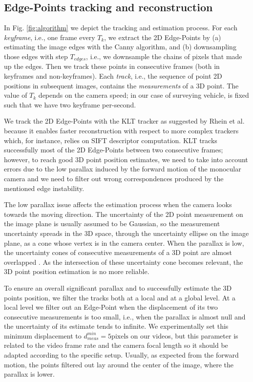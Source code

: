 

\subsection{Edge-Points tracking and reconstruction}
\label{subsubsec:Edge-Point-tracking}
In Fig. \ref{fig:algorithm} we depict the tracking and estimation process.
For each \emph{keyframe}, i.e., one frame every $T_k$, we extract the 2D Edge-Points by (a) estimating the image edges with the Canny algorithm, and (b) downsampling those edges with step $T_{edges}$, i.e., we downsample the chains of pixels that made up the edges. 
Then we track these points in consecutive frames (both in keyframes and non-keyframes). Each \emph{track}, i.e., the sequence of point 2D positions in subsequent images, contains the \emph{measurements} of a 3D point. The value of $T_k$ depends on the camera speed; in our case of surveying vehicle, is fixed such that we have two keyframe per-second. 


We track the 2D Edge-Points with the KLT tracker \cite{Lucas_Kanade81} as suggested by Rhein et al. \cite{Rhein_et_al13} because it enables faster reconstruction with respect to more complex trackers which, for instance, relies on SIFT descriptor computation.
KLT tracks successfully most of the 2D Edge-Points between two consecutive frames; however, to reach good 3D point position estimates, we need to take into account errors due to the low parallax induced by the forward motion of the monocular camera and we need to filter out wrong correspondences produced by the mentioned edge instability. 


The low parallax issue affects the estimation process when the camera looks towards the moving direction. The uncertainty of the 2D point measurement on the image plane is usually assumed to be Gaussian, so the measurement uncertainty spreads in the 3D space, through the uncertainty ellipse on the image plane, as a cone whose vertex is in the camera center. 
When the parallax is low, the uncertainty cones of consecutive measurements of a 3D point are almost overlapped \cite{hazi04}. As the intersection of these uncertainty cone becomes relevant, the 3D point position estimation is no more reliable.

To ensure  an overall significant parallax and to successfully estimate the 3D points position, we filter the tracks  both at a local and at a global level.
At a local level we filter out an Edge-Point when the displacement of its two consecutive measurements is too small, i.e., when the parallax is almost null and the uncertainty of its estimate tends to infinite. 
We experimentally set this minimum displacement to $d_{meas}^{min} = 5 \text{pixels}$ on our videos, but this parameter is related to the video frame rate and the camera focal length so it should be adapted according to the specific setup. 
Usually, as expected from the forward motion, the points filtered out lay around the center of the image, where the parallax is lower.

